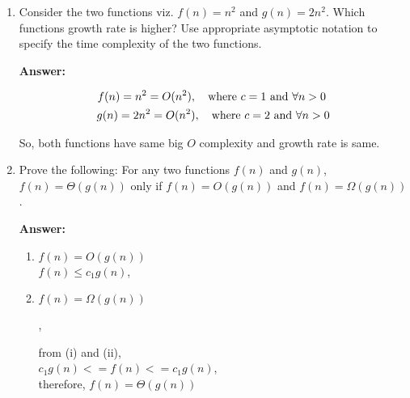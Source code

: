 \documentclass[a4paper]{article}
\begin{document}
\begin{enumerate}[label=(\alph*)]
     \vspace{0.5cm}
     \item Consider the two functions viz. {$ f(n) = n^2 $} and {$ g(n) = 2n^2 $}. Which functions growth rate is higher? Use appropriate asymptotic notation to specify the time complexity of the two functions.
 
     \textbf{Answer:}
 
     \begin{align*}
         f(n) = n^2  = O(n^2) , \quad \text{where {$ c = 1 $} and {$ \forall n > 0 $} } \\
         g(n) = 2n^2 = O(n^2), \quad \text{where {$ c = 2 $} and {$ \forall n > 0 $}}
     \end{align*}
 
     \begin{changemargin}{0.8cm}{0cm}
         So, both functions have same big {$ O $} complexity and growth rate is same.
     \end{changemargin}
     
     \vspace{0.5cm}
     \item Prove the following: For any two functions {$ f(n) $} and {$ g(n) $}, {$ f(n) = \Theta(g(n)) $}  only if {$ f(n) = O(g(n)) $} and {$ f(n) = \Omega(g(n)) $}. 
 
      \textbf{Answer:}
 
     \begin{enumerate}[label=(\roman*)]
         \item {$ f(n) = O(g(n)) $}
         \\{$ f(n) \le c_1 g(n) $}, 
    
         \vspace{0.5cm}
         \item {$ f(n) = \Omega(g(n)) $}
         
         , 
         
         \vspace{0.5cm}
         from (i) and (ii),
         \\{$ c_1 g(n) <= f(n) <= c_1 g(n) $}, 
         \
         \\therefore, {$ f(n) = \Theta(g(n)) $}
    
     \end{enumerate}
 

\end{enumerate}
\end{document}
